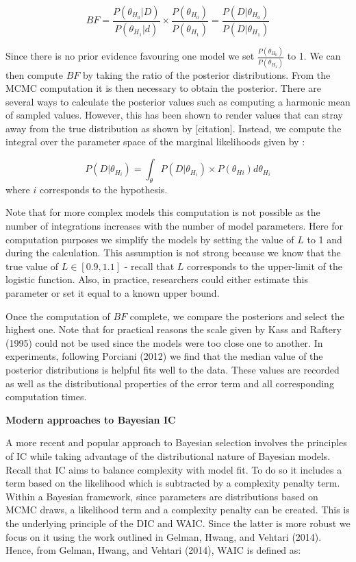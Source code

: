 \documentclass[12pt,]{article}
\begin{document}
\begin{equation}
BF =\frac {P(\theta_{H_0}|D)}{P(\theta_{H_1}|d)} \times \frac {P(\theta_{H_0})}{P(\theta_{H_1})} =\frac {P(D|\theta_{H_0})}{P(D|\theta_{H_1})}
\end{equation}

Since there is no prior evidence favouring one model we set \(\frac {P(\theta_{H_0})}{P(\theta_{H_1})}\) to 1. We can then compute \(BF\) by taking the ratio of the posterior distributions. From the MCMC computation it is then necessary to obtain the posterior. There are several ways to calculate the posterior values such as computing a harmonic mean of sampled values. However, this has been shown to render values that can stray away from the true distribution as shown by {[}citation{]}. Instead, we compute the integral over the parameter space of the marginal likelihoods given by :

\begin{equation}
P(D|\theta_{H_i}) = \int_\theta P(D|\theta_{H_i}) \times P(\theta_{Hi}) d\theta_{H_i}
\end{equation}
where \(i\) corresponds to the hypothesis.

Note that for more complex models this computation is not possible as the number of integrations increases with the number of model parameters. Here for computation purposes we simplify the models by setting the value of \(L\) to 1 and during the calculation. This assumption is not strong because we know that the true value of \(L \in [0.9, 1.1]\) - recall that \(L\) corresponds to the upper-limit of the logistic function. Also, in practice, researchers could either estimate this parameter or set it equal to a known upper bound.

Once the computation of \(BF\) complete, we compare the posteriors and select the highest one. Note that for practical reasons the scale given by Kass and Raftery (1995) could not be used since the models were too close one to another. In experiments, following Porciani (2012) we find that the median value of the posterior distributions is helpful fits well to the data. These values are recorded as well as the distributional properties of the error term and all corresponding computation times.

\textbf{Modern approaches to Bayesian IC}

A more recent and popular approach to Bayesian selection involves the principles of IC while taking advantage of the distributional nature of Bayesian models. Recall that IC aims to balance complexity with model fit. To do so it includes a term based on the likelihood which is subtracted by a complexity penalty term. Within a Bayesian framework, since parameters are distributions based on MCMC draws, a likelihood term and a complexity penalty can be created. This is the underlying principle of the DIC and WAIC. Since the latter is more robust we focus on it using the work outlined in Gelman, Hwang, and Vehtari (2014). Hence, from Gelman, Hwang, and Vehtari (2014), WAIC is defined as:
\end{document}
